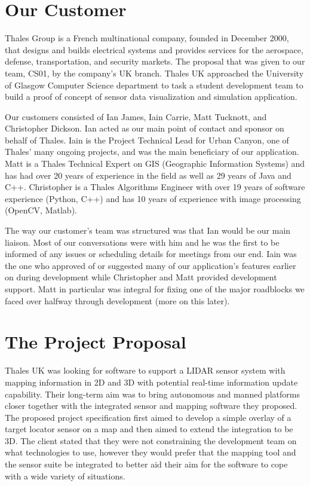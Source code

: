 \documentclass{l3proj}
\begin{document}
\section{Our Customer}

Thales Group is a French multinational company, founded in December 2000, that designs and builds electrical systems and provides services for the aerospace, defense, transportation, and security markets. The proposal that was given to our team, CS01, by the company’s UK branch. Thales UK approached the University of Glasgow Computer Science department to task a student development team to build a proof of concept of sensor data visualization and simulation application.

Our customers consisted of Ian James, Iain Carrie, Matt Tucknott, and Christopher Dickson. Ian acted as our main point of contact and sponsor on behalf of Thales. Iain is the Project Technical Lead for Urban Canyon, one of Thales’ many ongoing projects, and was the main beneficiary of our application. Matt is a Thales Technical Expert on GIS (Geographic Information Systems) and has had over 20 years of experience in the field as well as 29 years of Java and C++. Christopher is a Thales Algorithms Engineer with over 19 years of software experience (Python, C++) and has 10 years of experience with image processing (OpenCV, Matlab).

The way our customer’s team was structured was that Ian would be our main liaison. Most of our conversations were with him and he was the first to be informed of any issues or scheduling details for meetings from our end. Iain was the one who approved of or suggested many of our application’s features earlier on during development while Christopher and Matt provided development support. Matt in particular was integral for fixing one of the major roadblocks we faced over halfway through development (more on this later). 

\section{The Project Proposal}

Thales UK was looking for software to support a LIDAR sensor system with mapping information in 2D and 3D with potential real-time information update capability. Their long-term aim was to bring autonomous and manned platforms closer together with the integrated sensor and mapping software they proposed. The proposed project specification first aimed to develop a simple overlay of a target locator sensor on a map and then aimed to extend the integration to be 3D. The client stated that they were not constraining the development team on what technologies to use, however they would prefer that the mapping tool and the sensor suite be integrated to better aid their aim for the software to cope with a wide variety of situations.
\end{document}

